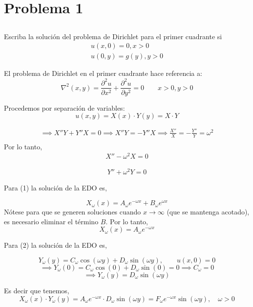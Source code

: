 \section{Problema 1}
\subsection{} Escriba la solución del problema de Dirichlet para el primer cuadrante si
$$
\begin{array}{c}
u(x, 0)=0, x>0 \\
u(0, y)=g(y), y>0
\end{array}
$$
\begin{solution}
El problema de Dirichlet en el primer cuadrante hace referencia a: 
$$\nabla^2(x,y)=\frac{\partial ^2 u}{\partial x^2}+\frac{\partial ^2 u}{\partial y^2}=0 \qquad x>0,y>0 $$

\linea 

Procedemos por separación de variables: 
$$u(x,y)=X(x)\cdot Y(y)= X\cdot Y$$

\begin{gather*}
    \implies X''Y+Y''X = 0 \implies X''Y=-Y''X \implies \frac{X''}{X} = -\frac{Y''}{Y}=\omega^2\\
\end{gather*}
Por lo tanto, 
\begin{gather}
     X''-\omega^2 X=0 
\end{gather}

\begin{gather}
     Y''+\omega^2 Y=0
\end{gather}

\linea 

Para (1) la solución de la EDO es, 

$$X_\omega(x)= A_\omega e^{-\omega x}+ B_\omega e^{\omega x}$$
Nótese para que se generen soluciones cuando $x\to \infty$ (que se mantenga acotado), es necesario eliminar el término $B$. Por lo tanto, 
$$X_\omega(x)= A_\omega e^{-\omega x}$$

\linea 

Para (2) la solución de la EDO es, 

$$Y_\omega (y)= C_\omega \cos(\omega y)+D_\omega\sin(\omega y), \qquad u(x,0)=0$$
$$\implies Y_\omega(0)= C_\omega\cos(0)+D_\omega\sin(0)=0\implies C_\omega=0$$
$$\implies Y_\omega(y)=D_\omega\sin(\omega y)$$

\linea 

Es decir que tenemos,
$$X_\omega(x)\cdot Y_\omega(y)=A_\omega e^{-\omega x}\cdot D_\omega\sin(\omega y)=F_\omega e^{-\omega x}\sin(\omega y), \quad \omega >0$$


\end{solution}

